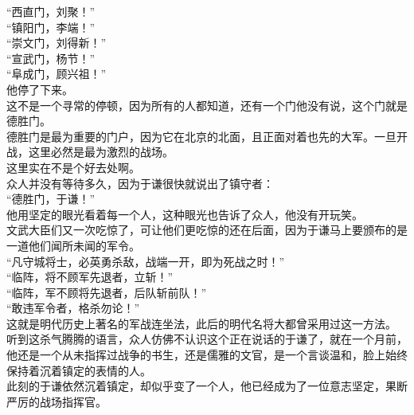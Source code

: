 \begin{multicols}{\theparacolNo}
“西直门，刘聚！”\\

“镇阳门，李端！”\\

“崇文门，刘得新！”\\

“宣武门，杨节！”\\

“阜成门，顾兴祖！”\\

他停了下来。\\

这不是一个寻常的停顿，因为所有的人都知道，还有一个门他没有说，这个门就是德胜门。\\

德胜门是最为重要的门户，因为它在北京的北面，且正面对着也先的大军。一旦开战，这里必然是最为激烈的战场。\\

这里实在不是个好去处啊。\\

众人并没有等待多久，因为于谦很快就说出了镇守者：\\

“德胜门，于谦！”\\

他用坚定的眼光看着每一个人，这种眼光也告诉了众人，他没有开玩笑。\\

文武大臣们又一次吃惊了，可让他们更吃惊的还在后面，因为于谦马上要颁布的是一道他们闻所未闻的军令。\\

“凡守城将士，必英勇杀敌，战端一开，即为死战之时！”\\

“临阵，将不顾军先退者，立斩！”\\

“临阵，军不顾将先退者，后队斩前队！”\\

“敢违军令者，格杀勿论！”\\

这就是明代历史上著名的军战连坐法，此后的明代名将大都曾采用过这一方法。\\

听到这杀气腾腾的语言，众人仿佛不认识这个正在说话的于谦了，就在一个月前，他还是一个从未指挥过战争的书生，还是儒雅的文官，是一个言谈温和，脸上始终保持着沉着镇定的表情的人。\\

此刻的于谦依然沉着镇定，却似乎变了一个人，他已经成为了一位意志坚定，果断严厉的战场指挥官。\\


\end{multicols}
